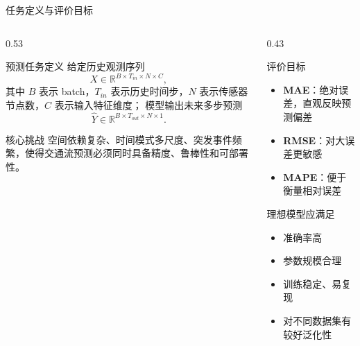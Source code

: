 \documentclass[10pt,aspectratio=169]{ctexbeamer}
\begin{document}
\begin{frame}{任务定义与评价目标}
  \begin{columns}[T]
    \begin{column}{0.53\textwidth}
      \begin{block}{预测任务定义}
        \small
        给定历史观测序列
        \[
          X \in \mathbb{R}^{B \times T_{in} \times N \times C},
        \]
        其中 $B$ 表示 batch，$T_{in}$ 表示历史时间步，$N$ 表示传感器节点数，$C$ 表示输入特征维度；
        模型输出未来多步预测
        \[
          \hat{Y} \in \mathbb{R}^{B \times T_{out} \times N \times 1}.
        \]
      \end{block}
      \begin{exampleblock}{核心挑战}
        \small 空间依赖复杂、时间模式多尺度、突发事件频繁，使得交通流预测必须同时具备精度、鲁棒性和可部署性。
      \end{exampleblock}
    \end{column}
    \begin{column}{0.43\textwidth}
      \begin{block}{评价目标}
        \begin{itemize}\setlength{\itemsep}{2pt}
          \item \textbf{MAE}：绝对误差，直观反映预测偏差
          \item \textbf{RMSE}：对大误差更敏感
          \item \textbf{MAPE}：便于衡量相对误差
        \end{itemize}
      \end{block}

      \begin{alertblock}{理想模型应满足}
        \begin{itemize}\setlength{\itemsep}{2pt}
          \item 准确率高
          \item 参数规模合理
          \item 训练稳定、易复现
          \item 对不同数据集有较好泛化性
        \end{itemize}
      \end{alertblock}
    \end{column}
  \end{columns}
\end{frame}
\end{document}
